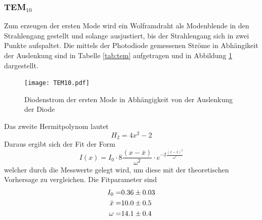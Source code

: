 \subsubsection{TEM$_\text{10}$}
Zum erzeugen der ersten Mode wird ein Wolframdraht als Modenblende in den Strahlengang gestellt und solange ausjustiert, bis der Strahlengang sich in zwei Punkte aufspaltet. Die mittels der Photodiode gemessenen Ströme in Abhängikeit der Auslenkung sind in Tabelle \ref{tab:tem} aufgetragen und in Abbildung \ref{fig:TEM10} dargestellt.
\begin{figure}
  \centering
  \texttt{[image: TEM10.pdf]}
  \caption{Diodenstrom der ersten Mode in Abhängigkeit von der Auslenkung der Diode}
  \label{fig:TEM10}
\end{figure}
Das zweite Hermitpolynom lautet
\begin{equation}
  H_2 = 4x^2 - 2
  \label{eqn:Herm}
\end{equation}
Daraus ergibt sich der Fit der Form
\begin{equation}
  I(x) = I_0 \cdot 8 \frac{\left( x - \bar{x} \right)}{\omega^2} \cdot e^{-2 \frac{\left( x - \bar{x} \right)^2}{\omega^2}}
  \label{eqn:TEM10}
\end{equation}
welcher durch die Messwerte gelegt wird, um diese mit der theoretischen Vorhersage zu vergleichen. Die Fitparameter sind
\begin{eqnarray}
  I_0 =& \num{0.36 +- 0.03}	\\
  \bar{x} =& \num{10.0 +- 0.5} \\
  \omega =& \num{14.1 +- 0.4}
\end{eqnarray}
 
